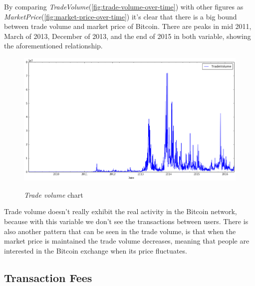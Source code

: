 By comparing
\textit{TradeVolume}(\autoref{fig:trade-volume-over-time}) with other
figures as \textit{MarketPrice}(\autoref{fig:market-price-over-time})
it's clear that there is a big bound between trade volume and market
price of Bitcoin. There are peaks in mid 2011, March of 2013, December
of 2013, and the end of 2015 in both variable, showing the
aforementioned relationship.

\begin{figure}[bth]
  \myfloatalign
  {\includegraphics[width=1\linewidth]
    {gfx/trade-volume-over-time}}
  \caption{\textit{Trade volume}
    chart}
  \label{fig:trade-volume-over-time}
\end{figure}

Trade volume doesn't really exhibit the real activity in the Bitcoin
network, because with this variable we don't see the transactions
between users. There is also another pattern that can be seen in the
trade volume, is that when the market price is maintained the trade
volume decreases, meaning that people are interested in the Bitcoin
exchange when its price fluctuates.


\subsection{Transaction Fees}
\label{sec:transaction-fees}

